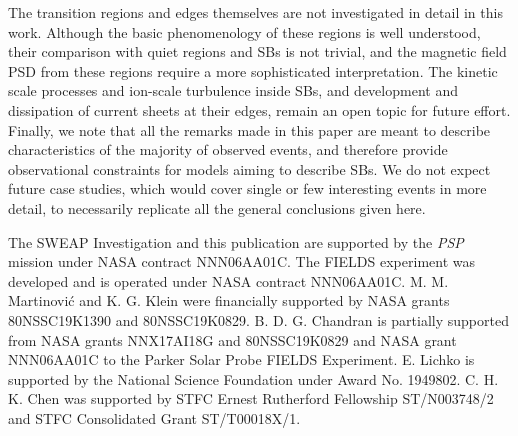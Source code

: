 \documentclass[]{aastex62}
\begin{document}
The transition regions and edges themselves are not investigated in detail in this work. Although the basic phenomenology of these regions is well understood, their comparison with quiet regions and SBs is not trivial, and the magnetic field PSD from these regions require a more sophisticated interpretation. The kinetic scale processes and ion-scale turbulence inside SBs, and development and dissipation of current sheets at their edges, remain an open topic for future effort. Finally, we note that all the remarks made in this paper are meant to describe characteristics of the majority of observed events, and therefore provide observational constraints for models aiming to describe SBs. We do not expect future case studies, which would cover single or few interesting events in more detail, to necessarily replicate all the general conclusions given here. 

\acknowledgments

The SWEAP Investigation and this publication are supported by the \emph{PSP} mission under NASA contract NNN06AA01C.
The FIELDS experiment was developed and is operated under NASA contract NNN06AA01C. 
M. M. Martinovi\'c and K. G. Klein were financially supported by NASA grants 80NSSC19K1390 and 80NSSC19K0829. B. D. G. Chandran is partially supported from NASA grants NNX17AI18G and 80NSSC19K0829 and NASA grant NNN06AA01C to the Parker Solar Probe FIELDS Experiment.
E. Lichko is supported by the National Science Foundation under Award No. 1949802. C. H. K. Chen was supported by STFC Ernest Rutherford Fellowship ST/N003748/2 and STFC Consolidated Grant ST/T00018X/1.
\end{document}
